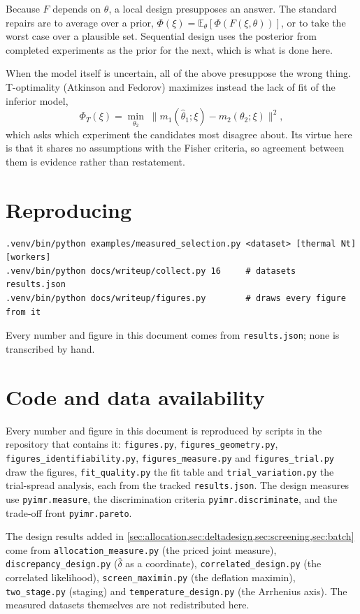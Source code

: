 \documentclass[10pt]{article}
\begin{document}
Because $F$ depends on $\theta$, a local design presupposes an answer. The standard repairs
are to average over a prior, $\Phi(\xi) = \mathbb{E}_\theta[\Phi(F(\xi,\theta))]$, or to
take the worst case over a plausible set. Sequential design uses the posterior from
completed experiments as the prior for the next, which is what is done here.

When the model itself is uncertain, all of the above presuppose the wrong thing. T-optimality
(Atkinson and Fedorov) maximizes instead the lack of fit of the inferior model,
%
\begin{equation}
\Phi_T(\xi) = \min_{\theta_2}\;\big\|m_1(\hat\theta_1;\xi) - m_2(\theta_2;\xi)\big\|^2 ,
\end{equation}
%
which asks which experiment the candidates most disagree about. Its virtue here is that it
shares no assumptions with the Fisher criteria, so agreement between them is evidence rather
than restatement.

\section{Reproducing}

\begin{verbatim}
.venv/bin/python examples/measured_selection.py <dataset> [thermal Nt] [workers]
.venv/bin/python docs/writeup/collect.py 16     # datasets results.json
.venv/bin/python docs/writeup/figures.py        # draws every figure from it
\end{verbatim}

Every number and figure in this document comes from \texttt{results.json}; none is
transcribed by hand.

\section*{Code and data availability}

Every number and figure in this document is reproduced by scripts in the repository that
contains it: \texttt{figures.py}, \texttt{figures\_geometry.py},
\texttt{figures\_identifiability.py}, \texttt{figures\_measure.py} and
\texttt{figures\_trial.py} draw the figures, \texttt{fit\_quality.py} the fit table and
\texttt{trial\_variation.py} the trial-spread analysis, each from the tracked
\texttt{results.json}. The design measures use \texttt{pyimr.measure}, the discrimination
criteria \texttt{pyimr.discriminate}, and the trade-off front \texttt{pyimr.pareto}.

The design results added in \cref{sec:allocation,sec:deltadesign,sec:screening,sec:batch} come
from \texttt{allocation\_measure.py} (the priced joint measure),
\texttt{discrepancy\_design.py} ($\hat\delta$ as a coordinate),
\texttt{correlated\_design.py} (the correlated likelihood),
\texttt{screen\_maximin.py} (the deflation maximin), \texttt{two\_stage.py} (staging) and
\texttt{temperature\_design.py} (the Arrhenius axis). The measured datasets themselves are not
redistributed here.



\end{document}
